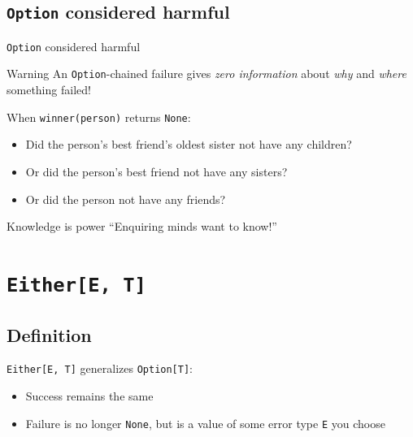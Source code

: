 \subsection{\texttt{Option} considered harmful}

\begin{frame}{\texttt{Option} considered harmful}
  \begin{alertblock}{Warning}
    An \texttt{Option}-chained failure gives \emph{zero information} about
    \emph{why} and \emph{where} something failed!
  \end{alertblock}

  When \texttt{winner(person)} returns
  \texttt{None}:
  \begin{itemize}
  \item Did the person's best friend's oldest sister not have any children?
  \item Or did the person's best friend not have any sisters?
  \item Or did the person not have any friends?
  \end{itemize}

  \begin{alertblock}{Knowledge is power}
    ``Enquiring minds want to know!''
  \end{alertblock}
\end{frame}

\section{\texttt{Either[E, T]}}

\subsection{Definition}

\texttt{Either[E, T]} generalizes \texttt{Option[T]}:
\begin{itemize}
\item Success remains the same
\item Failure is no longer \texttt{None}, but is a value of some error
  type \texttt{E} you choose
\end{itemize}

